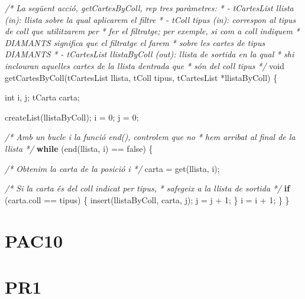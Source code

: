 \documentclass[
]{book}
\newenvironment{Shaded}{\begin{snugshade}}{\end{snugshade}}
\newcommand{\CommentTok}[1]{\textcolor[rgb]{0.56,0.35,0.01}{\textit{#1}}}
\newcommand{\ControlFlowTok}[1]{\textcolor[rgb]{0.13,0.29,0.53}{\textbf{#1}}}
\newcommand{\DataTypeTok}[1]{\textcolor[rgb]{0.13,0.29,0.53}{#1}}
\newcommand{\DecValTok}[1]{\textcolor[rgb]{0.00,0.00,0.81}{#1}}
\newcommand{\NormalTok}[1]{#1}
\begin{document}
\begin{Shaded}
\begin{Highlighting}[]
\CommentTok{/* La següent acció, getCartesByColl, rep tres paràmetres:}
\CommentTok{ * {-} tCartesList llista (in): llista sobre la qual aplicarem el filtre}
\CommentTok{ * {-} tColl tipus (in): correspon al tipus de coll que utilitzarem per }
\CommentTok{ *   fer el filtratge; per exemple, si com a coll indiquem }
\CommentTok{ *   DIAMANTS significa que el filtratge el farem}
\CommentTok{ *   sobre les cartes de tipus DIAMANTS}
\CommentTok{ * {-} tCartesList llistaByColl (out): llista de sortida en la qual }
\CommentTok{ *   s\textquotesingle{}hi inclouran aquelles cartes de la llista d\textquotesingle{}entrada que }
\CommentTok{ *   són del coll tipus}
\CommentTok{ */}
\DataTypeTok{void}\NormalTok{ getCartesByColl(tCartesList llista, tColl tipus, tCartesList *llistaByColl) \{}

    \DataTypeTok{int}\NormalTok{ i, j;}
\NormalTok{    tCarta carta;}

\NormalTok{    createList(llistaByColl);}
\NormalTok{    i = }\DecValTok{0}\NormalTok{;}
\NormalTok{    j = }\DecValTok{0}\NormalTok{;}

    \CommentTok{/* Amb un bucle i la funció end(), controlem que no }
\CommentTok{     * hem arribat al final de la llista }
\CommentTok{     */}
   \ControlFlowTok{while}\NormalTok{ (end(llista, i) == false) \{}

        \CommentTok{/* Obtenim la carta de la posició i */}
\NormalTok{        carta = get(llista, i);}

        \CommentTok{/* Si la carta és del coll indicat per tipus, }
\CommentTok{         * s\textquotesingle{}afegeix a la llista de sortida }
\CommentTok{         */}
        \ControlFlowTok{if}\NormalTok{ (carta.coll == tipus) \{}
\NormalTok{            insert(llistaByColl, carta, j);}
\NormalTok{            j = j + }\DecValTok{1}\NormalTok{;}
\NormalTok{        \}}
\NormalTok{        i = i + }\DecValTok{1}\NormalTok{;}
\NormalTok{    \}}
\NormalTok{\}}
\end{Highlighting}
\end{Shaded}

\hypertarget{pac10}{%
\chapter{PAC10}\label{pac10}}

\hypertarget{pr1}{%
\chapter{PR1}\label{pr1}}
\end{document}
